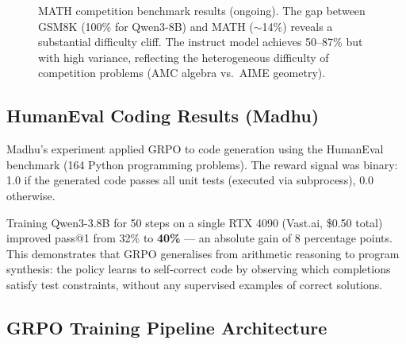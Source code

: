 \documentclass[12pt,a4paper]{report}
\theoremstyle{definition}
\begin{document}
\begin{figure}[htbp]
\centering
{}
\caption{MATH competition benchmark results (ongoing). The gap between GSM8K (100\% for Qwen3-8B) and MATH ($\sim$14\%) reveals a substantial difficulty cliff. The instruct model achieves 50--87\% but with high variance, reflecting the heterogeneous difficulty of competition problems (AMC algebra vs.\ AIME geometry).}
\label{fig:math_curves}
\end{figure}

\subsection{HumanEval Coding Results (Madhu)}

Madhu's experiment applied GRPO to code generation using the HumanEval benchmark (164 Python programming problems). The reward signal was binary: 1.0 if the generated code passes all unit tests (executed via subprocess), 0.0 otherwise.

Training Qwen3-3.8B for 50 steps on a single RTX 4090 (Vast.ai, \$0.50 total) improved pass@1 from 32\% to \textbf{40\%} --- an absolute gain of 8 percentage points. This demonstrates that GRPO generalises from arithmetic reasoning to program synthesis: the policy learns to self-correct code by observing which completions satisfy test constraints, without any supervised examples of correct solutions.

\subsection{GRPO Training Pipeline Architecture}
\end{document}
